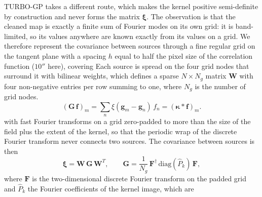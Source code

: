TURBO-GP takes a different route, which makes the kernel positive semi-definite by construction and never forms the matrix $\boldsymbol{\xi}$.
The observation is that the cleaned map is exactly a finite sum of Fourier modes on its own grid: it is band-limited, so its values anywhere are 
known exactly from its values on a grid.
We therefore represent the covariance between sources through a fine regular grid on the tangent plane with a spacing $h$ equal to half the pixel size of 
the correlation function ($10''$ here), covering 
Each source is spread on the four grid nodes that surround it with bilinear weights, which defines a sparse $N \times N_g$ matrix $\mathbf{W}$ with
four non-negative entries per row summing to one, where $N_g$ is the number of grid nodes.
\begin{equation}
\label{eq:G}
(\mathbf{G}\, \mathbf{f})_m = \sum_{n} \xi(\mathbf{g}_m - \mathbf{g}_n)\, f_n = (\boldsymbol{\kappa} \ast \mathbf{f})_m .
\end{equation}
 with fast Fourier transforms on a grid zero-padded to more than the size of the field plus the extent
of the kernel, so that the periodic wrap of the discrete Fourier transform never connects two sources.
The covariance between sources is then
\begin{equation}
\label{eq:wgw}
\boldsymbol{\xi} = \mathbf{W}\, \mathbf{G}\, \mathbf{W}^T, \qquad \mathbf{G} = \frac{1}{N_g}\, \mathbf{F}^{\dagger}\, \mathrm{diag}(\hat{P}_k)\, \mathbf{F},
\end{equation}
where $\mathbf{F}$ is the two-dimensional discrete Fourier transform on the padded grid and $\hat{P}_k$ the Fourier coefficients of the kernel image, which are 
